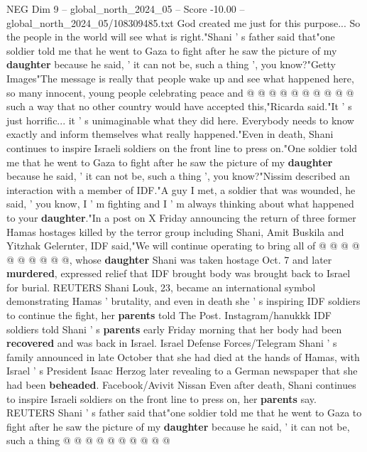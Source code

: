 \begin{textsample}{NEG Dim 9 – global\_north\_2024\_05 – Score -10.00 – global\_north\_2024\_05/108309485.txt}
God created me just for this purpose...
So the people in the world will see what is right."Shani ' s father said that"one soldier told me that he went to Gaza to fight after he saw the picture of my \textbf{daughter} because he said, ' it can not be, such a thing ', you know?"Getty Images"The message is really that people wake up and see what happened here, so many innocent, young people celebrating peace and @ @ @ @ @ @ @ @ @ @ such a way that no other country would have accepted this,"Ricarda said."It ' s just horrific... it ' s unimaginable what they did here.
Everybody needs to know exactly and inform themselves what really happened."Even in death, Shani continues to inspire Israeli soldiers on the front line to press on."One soldier told me that he went to Gaza to fight after he saw the picture of my \textbf{daughter} because he said, ' it can not be, such a thing ', you know?"Nissim described an interaction with a member of IDF."A guy I met, a soldier that was wounded, he said, ' you know, I ' m fighting and I ' m always thinking about what happened to your \textbf{daughter}."In a post on X Friday announcing the return of three former Hamas hostages killed by the terror group including Shani, Amit Buskila and Yitzhak Gelernter, IDF said,"We will continue operating to bring all of @ @ @ @ @ @ @ @ @ @, whose \textbf{daughter} Shani was taken hostage Oct. 7 and later \textbf{murdered}, expressed relief that IDF brought body was brought back to Israel for burial.
REUTERS Shani Louk, 23, became an international symbol demonstrating Hamas ' brutality, and even in death she ' s inspiring IDF soldiers to continue the fight, her \textbf{parents} told The Post.
Instagram/hanukkk IDF soldiers told Shani ' s \textbf{parents} early Friday morning that her body had been \textbf{recovered} and was back in Israel.
Israel Defense Forces/Telegram Shani ' s family announced in late October that she had died at the hands of Hamas, with Israel ' s President Isaac Herzog later revealing to a German newspaper that she had been \textbf{beheaded}.
Facebook/Avivit Nissan Even after death, Shani continues to inspire Israeli soldiers on the front line to press on, her \textbf{parents} say.
REUTERS Shani ' s father said that"one soldier told me that he went to Gaza to fight after he saw the picture of my \textbf{daughter} because he said, ' it can not be, such a thing @ @ @ @ @ @ @ @ @ @

\end{textsample}
